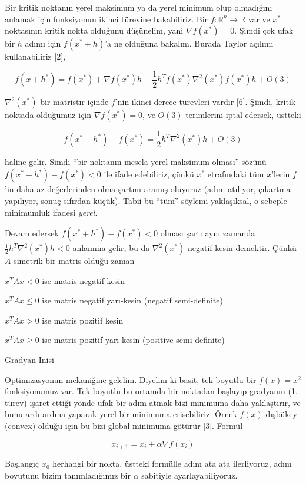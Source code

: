\documentclass[12pt,fleqn]{article}\usepackage{../../common}
\begin{document}
Bir kritik noktanın yerel maksimum ya da yerel minimum olup olmadığını
anlamak için fonksiyonun ikinci türevine bakabiliriz. Bir
$f: \mathbb{R}^n \to \mathbb{R}$ var ve $x^*$ noktasının kritik nokta
olduğunu düşünelim, yani $\nabla f(x^*) = 0$. Şimdi çok ufak bir $h$ adımı
için $f(x^* + h)$'a ne olduğuna bakalım. Burada Taylor açılımı
kullanabiliriz [2], 

$$
f(x + h^*) = 
f(x^*) + \nabla f(x^*) h + 
\frac{1}{2} h^T f(x^*) \nabla^2 (x^*) f(x^*) h + 
O(3)
$$

$\nabla^2 (x^*)$ bir matristır içinde $f$'nin ikinci derece türevleri
vardır [6]. Şimdi, kritik noktada olduğumuz için $\nabla f(x^*) = 0$, ve
$O(3)$ terimlerini iptal edersek, üstteki

$$
f(x^* + h^*) - f(x^*) = \frac{1}{2} h^T \nabla^2 (x^*)  h + O(3)
$$

haline gelir. Simdi ``bir noktanın mesela yerel maksimum olması'' sözünü
$f(x^* + h^*) - f(x^*) < 0$ ile ifade edebiliriz, çünkü $x^*$ etrafındaki
tüm $x$'lerin $f$'in daha az değerlerinden olma şartını aramış oluyoruz
(adım atılıyor, çıkartma yapılıyor, sonuç sıfırdan küçük). Tabii bu ``tüm''
söylemi yaklaşıksal, o sebeple minimumluk ifadesi {\em yerel}.

Devam edersek $f(x^* + h^*) - f(x^*) < 0$ olması şartı aynı zamanda
$\frac{1}{2} h^T \nabla^2 (x^*) h < 0$ anlamına gelir, bu da
$\nabla^2 (x^*)$ negatif kesin demektir. Çünkü $A$ simetrik bir matris
olduğu zaman

$x^TAx < 0$ ise matris negatif kesin

$x^TAx \le 0$ ise matris negatif yarı-kesin (negatif semi-definite)

$x^TAx > 0$ ise matris pozitif kesin

$x^TAx \ge 0$ ise matris pozitif yarı-kesin (positive semi-definite)

Gradyan Inisi

Optimizasyonun mekaniğine gelelim. Diyelim ki basit, tek boyutlu bir $f(x)
= x^2$ fonksiyonumuz var. Tek boyutlu bu ortamda bir noktadan başlayıp
gradyanın (1. türev) işaret ettiği yönde ufak bir adım atmak bizi minimuma
daha yaklaştırır, ve bunu ardı ardına yaparak yerel bir minimuma
erisebiliriz. Örnek $f(x)$ dışbükey (convex) olduğu için bu bizi global
minimuma götürür [3]. Formül

$$
x_{i+1} = x_i + \alpha \nabla f(x_i)
$$

Başlangıç $x_0$ herhangi bir nokta, üstteki formülle adım ata ata
ilerliyoruz, adım boyutunu bizim tanımladığımız bir $\alpha$ sabitiyle
ayarlayabiliyoruz. 
\end{document}
